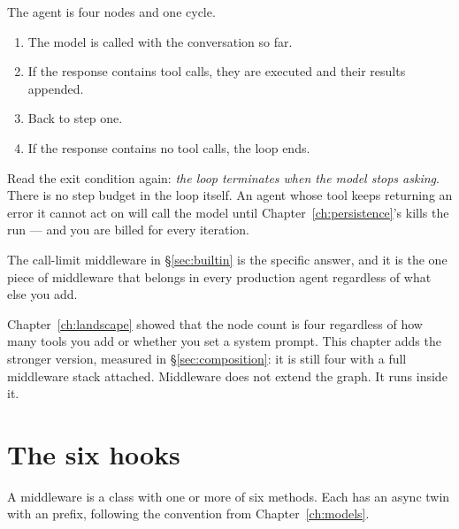 The agent is four nodes and one cycle.


\begin{enumerate}[leftmargin=1.4em,nosep]
\item The model is called with the conversation so far.
\item If the response contains tool calls, they are executed and their results
      appended.
\item Back to step one.
\item If the response contains no tool calls, the loop ends.
\end{enumerate}

\begin{warning}
Read the exit condition again: \emph{the loop terminates when the model stops
asking}. There is no step budget in the loop itself. An agent whose tool keeps
returning an error it cannot act on will call the model until
Chapter~\ref{ch:persistence}'s  kills the run --- and
you are billed for every iteration.

The call-limit middleware in \S\ref{sec:builtin} is the specific answer, and it
is the one piece of middleware that belongs in every production agent regardless
of what else you add.
\end{warning}

\begin{note}
Chapter~\ref{ch:landscape} showed that the node count is four regardless of how
many tools you add or whether you set a system prompt. This chapter adds the
stronger version, measured in \S\ref{sec:composition}: it is still four with a
full middleware stack attached. Middleware does not extend the graph. It runs
inside it.
\end{note}

\section{The six hooks}
\label{sec:hooks}

A middleware is a class with one or more of six methods. Each has an async twin
with an  prefix, following the convention from
Chapter~\ref{ch:models}.

